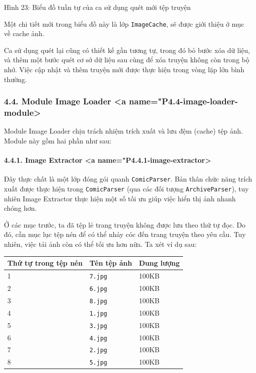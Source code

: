 \documentclass[
]{article}
\begin{document}
Hình 23: Biểu đồ tuần tự của ca sử dụng quét mới tệp truyện

Một chi tiết mới trong biểu đồ này là lớp \texttt{ImageCache}, sẽ được
giới thiệu ở mục về cache ảnh.

Ca sử dụng quét lại cũng có thiết kế gần tương tự, trong đó bỏ bước xóa
dữ liệu, và thêm một bước quét cơ sở dữ liệu sau cùng để xóa truyện
không còn trong bộ nhớ. Việc cập nhật và thêm truyện mới được thực hiện
trong vòng lặp lớn bình thường.

\hypertarget{module-image-loader-a-namep4.4-image-loader-module}{%
\subsubsection{4.4. Module Image Loader \textless a
name="P4.4-image-loader-module\textgreater{}}\label{module-image-loader-a-namep4.4-image-loader-module}}

Module Image Loader chịu trách nhiệm trích xuất và lưu đệm (cache) tệp
ảnh. Module này gồm hai phần như sau:

\hypertarget{image-extractor-a-namep4.4.1-image-extractor}{%
\paragraph{4.4.1. Image Extractor \textless a
name="P4.4.1-image-extractor\textgreater{}}\label{image-extractor-a-namep4.4.1-image-extractor}}

Đây thực chất là một lớp đóng gói quanh \texttt{ComicParser}. Bản thân
chức năng trích xuất được thực hiện trong \texttt{ComicParser} (qua các
đối tượng \texttt{ArchiveParser}), tuy nhiên Image Extractor thực hiện
một số tối ưu giúp việc hiển thị ảnh nhanh chóng hơn.

Ở các mục trước, ta đã tệp lẻ trang truyện không được lưu theo thứ tự
đọc. Do đó, cần mục lục tệp nén để có thể nhảy cóc đến trang truyện theo
yêu cầu. Tuy nhiên, việc tải ảnh còn có thể tối ưu hơn nữa. Ta xét ví dụ
sau:

\begin{longtable}[]{@{}lll@{}}
\toprule
Thứ tự trong tệp nén & Tên tệp ảnh & Dung lượng \\
\midrule
\endhead
1 & \texttt{7.jpg} & 100KB \\
2 & \texttt{6.jpg} & 100KB \\
3 & \texttt{8.jpg} & 100KB \\
4 & \texttt{1.jpg} & 100KB \\
5 & \texttt{3.jpg} & 100KB \\
6 & \texttt{4.jpg} & 100KB \\
7 & \texttt{2.jpg} & 100KB \\
8 & \texttt{5.jpg} & 100KB \\
\bottomrule
\end{longtable}
\end{document}
